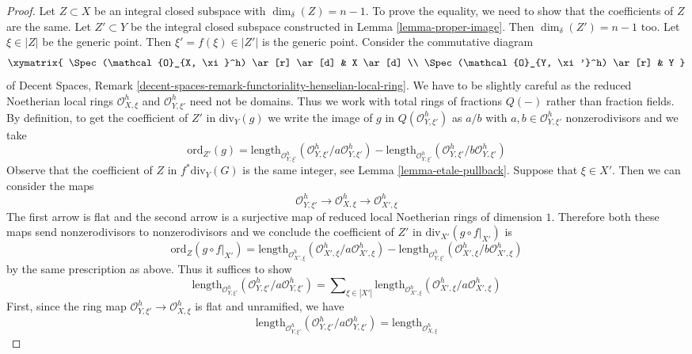 \begin{proof}
\medskip\noindent
Let $Z \subset X$ be an integral closed subspace with $\dim_\delta(Z) = n - 1$.
To prove the equality, we need to show that the coefficients
of $Z$ are the same. Let $Z' \subset Y$ be the integral closed
subspace constructed in Lemma \ref{lemma-proper-image}.
Then $\dim_\delta(Z') = n - 1$ too. Let $\xi \in |Z|$ be the generic point.
Then $\xi' = f(\xi) \in |Z'|$ is the generic point.
Consider the commutative diagram
$$
\xymatrix{
\Spec(\mathcal{O}_{X, \xi}^h) \ar[r] \ar[d] & X \ar[d] \\
\Spec(\mathcal{O}_{Y, \xi'}^h) \ar[r] & Y
}
$$
of Decent Spaces, Remark
\ref{decent-spaces-remark-functoriality-henselian-local-ring}.
We have to be slightly careful as the reduced Noetherian local rings
$\mathcal{O}_{X, \xi}^h$ and $\mathcal{O}_{Y, \xi'}^h$ need not be domains.
Thus we work with total rings of fractions $Q(-)$ rather than fraction fields.
By definition, to get the coefficient of $Z'$ in $\text{div}_Y(g)$
we write the image of $g$ in $Q(\mathcal{O}_{Y, \xi'}^h)$
as $a/b$ with $a, b \in \mathcal{O}_{Y, \xi'}^h$ nonzerodivisors
and we take
$$
\text{ord}_{Z'}(g) =
\text{length}_{\mathcal{O}_{Y, \xi'}^h}
(\mathcal{O}_{Y, \xi'}^h/a \mathcal{O}_{Y, \xi'}^h) -
\text{length}_{\mathcal{O}_{Y, \xi'}^h}
(\mathcal{O}_{Y, \xi'}^h/b \mathcal{O}_{Y, \xi'}^h)
$$
Observe that the coefficient of $Z$ in $f^*\text{div}_Y(G)$
is the same integer, see Lemma \ref{lemma-etale-pullback}.
Suppose that $\xi \in X'$. Then we can consider the maps
$$
\mathcal{O}_{Y, \xi'}^h \to
\mathcal{O}_{X, \xi}^h \to
\mathcal{O}_{X', \xi}^h
$$
The first arrow is flat and the second arrow is a surjective
map of reduced local Noetherian rings of dimension $1$.
Therefore both these maps send nonzerodivisors to nonzerodivisors
and we conclude the coefficient of $Z'$ in $\text{div}_{X'}(g \circ f|_{X'})$
is
$$
\text{ord}_Z(g \circ f|_{X'}) =
\text{length}_{\mathcal{O}_{X', \xi}^h}
(\mathcal{O}_{X', \xi}^h/a \mathcal{O}_{X', \xi}^h) -
\text{length}_{\mathcal{O}_{Y, \xi'}^h}
(\mathcal{O}_{X', \xi}^h/b \mathcal{O}_{X', \xi}^h)
$$
by the same prescription as above. Thus it suffices to show
$$
\text{length}_{\mathcal{O}_{Y, \xi'}^h}
(\mathcal{O}_{Y, \xi'}^h/a \mathcal{O}_{Y, \xi'}^h) =
\sum\nolimits_{\xi \in |X'|}
\text{length}_{\mathcal{O}_{X', \xi}^h}
(\mathcal{O}_{X', \xi}^h/a \mathcal{O}_{X', \xi}^h)
$$
First, since the ring map $\mathcal{O}_{Y, \xi'}^h \to
\mathcal{O}_{X, \xi}^h$ is flat and unramified, we have
$$
\text{length}_{\mathcal{O}_{Y, \xi'}^h}
(\mathcal{O}_{Y, \xi'}^h/a \mathcal{O}_{Y, \xi'}^h) =
\text{length}_{\mathcal{O}_{X, \xi}^h}
$$
\end{proof}
